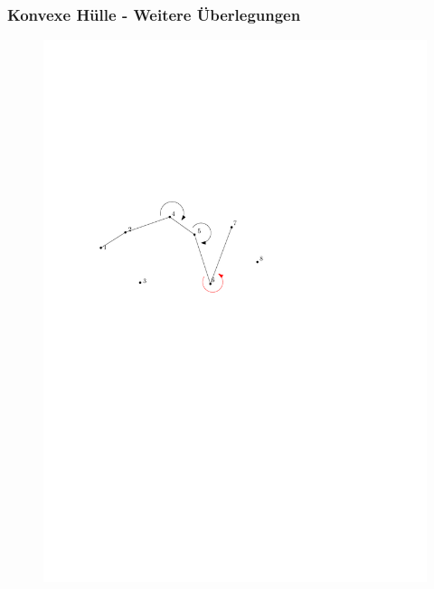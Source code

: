 \begin{frame}
	\frametitle{{Konvexe Hülle - Weitere Überlegungen}}
\begin{figure}[htbp]
	\begin{center}
  	\includegraphics[width=.8\linewidth]{bilder/graham6}
	\end{center}
\end{figure}
\end{frame}


